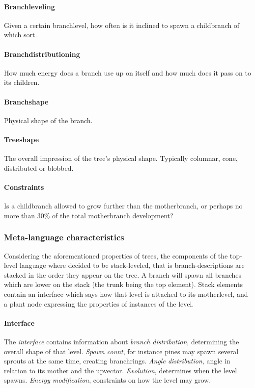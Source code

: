\paragraph{Branchleveling}
Given a certain branchlevel, how often is it inclined to spawn a childbranch
of which sort.

\paragraph{Branchdistributioning}
How much energy does a branch use up on itself and how much does it pass on to
its children.

\paragraph{Branchshape}
Physical shape of the branch.

\paragraph{Treeshape}
The overall impression of the tree's physical shape. Typically columnar, cone,
distributed or blobbed.

\paragraph{Constraints}
Is a childbranch allowed to grow further than the motherbranch, or perhaps no
more than 30\% of the total motherbranch development?

\subsubsection{Meta-language characteristics}
Considering the aforementioned properties of trees, the components of the 
top-level language where decided to be stack-leveled, that is
branch-descriptions are stacked in the order they appear on the tree. A branch 
will spawn all branches which are lower on the stack (the trunk being the top 
element). Stack elements contain an interface which says how that level is
attached to its motherlevel, and a plant node expressing the properties of
instances of the level.

\paragraph{Interface}
The \emph{interface} contains information about \emph{branch distribution}, 
determining the overall shape of that level. \emph{Spawn count}, for instance 
pines may spawn several sprouts at the same time, creating branchrings. \emph{Angle 
distribution}, angle in relation to its mother and the upvector. \emph{Evolution}, 
determines when the level spawns. \emph{Energy modification}, constraints on 
how the level may grow.


